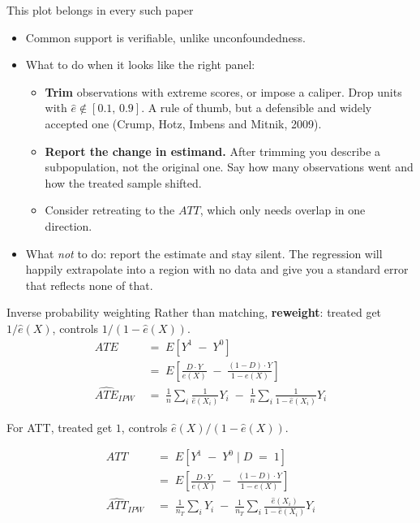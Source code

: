 \documentclass[
  11pt,
  ignorenonframetext,
  aspectratio=169,
]{beamer}
\newcounter{none} %
\providecommand{\tightlist}{%
  \setlength{\itemsep}{0pt}\setlength{\parskip}{0pt}}
\begin{document}
\begin{frame}{This plot belongs in every such paper}
\protect{}\label{this-plot-belongs-in-every-such-paper}
\begin{itemize}
\tightlist
\item
  Common support is verifiable, unlike unconfoundedness.
\item
  What to do when it looks like the right panel:

  \begin{itemize}
  \tightlist
  \item
    \textbf{Trim} observations with extreme scores, or impose a caliper.
    Drop units with \(\hat e \notin [0.1,\,0.9]\). A rule of thumb, but
    a defensible and widely accepted one (Crump, Hotz, Imbens and
    Mitnik, 2009).
  \item
    \textbf{Report the change in estimand.} After trimming you describe
    a subpopulation, not the original one. Say how many observations
    went and how the treated sample shifted.
  \item
    Consider retreating to the \(ATT\), which only needs overlap in one
    direction.
  \end{itemize}
\item
  What \emph{not} to do: report the estimate and stay silent. The
  regression will happily extrapolate into a region with no data and
  give you a standard error that reflects none of that.
\end{itemize}
\end{frame}

\begin{frame}{Inverse probability weighting}
\protect{}\label{inverse-probability-weighting}
Rather than matching, \textbf{reweight}: treated get \(1/\hat e(X)\),
controls \(1/(1-\hat e(X))\). \[
\begin{aligned}
{ATE} &\;=\; E\left[ Y^1 \;-\; Y^0 \right]  \\
      &\;=\; E\left[ \frac{D \cdot Y}{e(X)} \;-\; \frac{(1 - D) \cdot Y}{1 - e(X)} \right] \\
\widehat{ATE}_{IPW} &\;=\; \frac{1}{n}\sum_i \frac{1}{\hat e(X_i)}Y_i \;-\; \frac{1}{n}\sum_i \frac{1}{1 - \hat e(X_i)}Y_i
\end{aligned}
\]

For ATT, treated get \(1\), controls \(\hat e(X)/(1-\hat e(X))\).

\[
\begin{aligned}
{ATT} &\;=\; E\left[ Y^1 \;-\; Y^0 \mid D \;=\; 1  \right]  \\
      &\;=\; E\left[ \frac{D \cdot Y}{e(X)} \;-\; \frac{(1 - D) \cdot Y}{1 - e(X)} \right] \\
\widehat{ATT}_{IPW} &\;=\; \frac{1}{n_T}\sum_i Y_i \;-\; \frac{1}{n_T}\sum_i \frac{\hat e(X_i) }{1 - \hat e(X_i)}Y_i
\end{aligned}
\]
\end{frame}
\end{document}
